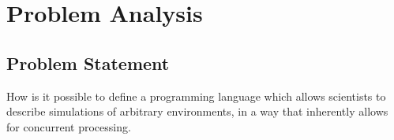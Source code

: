\chapter{Problem Analysis}
\section{Problem Statement}
How is it possible to define a programming language which allows scientists to describe simulations of arbitrary environments, in a way that inherently allows for concurrent processing.
